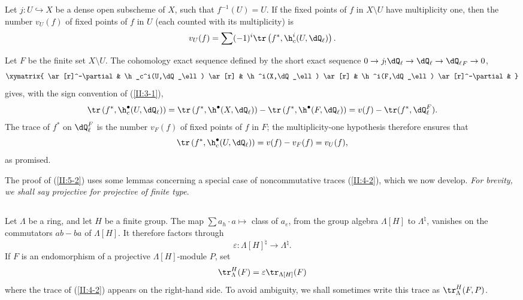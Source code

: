 \documentclass[oneside]{book}
\begin{document}
\begin{corollary_}\label{II:5-4}
Let $j:U\hookrightarrow X$ be a dense open subscheme of $X$, such that
$f^{-1}(U)=U$. If the fixed points of $f$ in $X\setminus U$ have multiplicity
one, then the number $v_U(f)$ of fixed points of $f$ in $U$ (each counted
with its multiplicity) is
\[
  v_U(f) = \sum (-1)^i \tr\left(f^*,\h_c^i(U,\dQ_\ell)\right) \text{.}
\]
\end{corollary_}

Let $F$ be the finite set $X\setminus U$. The cohomology exact sequence
defined by the short exact sequence
$0\to j_! \dQ_\ell\to\dQ_\ell\to{\dQ_\ell}_F\to 0$,
\[\xymatrix{
  \ar[r]^-\partial
    & \h_c^i(U,\dQ_\ell) \ar[r]
    & \h^i(X,\dQ_\ell) \ar[r]
    & \h^i(F,\dQ_\ell) \ar[r]^-\partial
    &
}\]
gives, with the sign convention of (\ref{II:3-1}),
\[
  \tr\left(f^*,\h_c^\bullet(U,\dQ_\ell)\right)
    = \tr\left(f^*,\h^\bullet(X,\dQ_\ell)\right) - \tr\left(f^*,\h^\bullet(F,\dQ_\ell)\right)
    = v(f) - \tr(f^*,\dQ_\ell^F) \text{.}
\]
The trace of $f^*$ on $\dQ_\ell^F$ is the number $v_F(f)$ of fixed points of
$f$ in $F$; the multiplicity-one hypothesis therefore ensures that
\[
  \tr\left(f^*,\h_c^\bullet(U,\dQ_\ell)\right)
    = v(f) - v_F(f) = v_U(f) \text{,}
\]
as promised.

The proof of (\ref{II:5-2}) uses some lemmas concerning a special case of
noncommutative traces (\ref{II:4-2}), which we now develop. \emph{For
brevity, we shall say projective for projective of finite type}.






\subsection{}\label{II:5-5}

Let $\Lambda$ be a ring, and let $H$ be a finite group. The map
$\sum a_h \cdot a\mapsto $ class of $a_e$, from the group algebra
$\Lambda[H]$ to $\Lambda^\natural$, vanishes on the commutators $ab-ba$ of
$\Lambda[H]$. It therefore factors through
\[
  \varepsilon : \Lambda[H]^\natural \to \Lambda^\natural \text{.}
\]
If $F$ is an endomorphism of a projective $\Lambda[H]$-module $P$, set
\[
  \tr_\Lambda^H(F) = \varepsilon \tr_{\Lambda[H]} (F)
\]
where the trace of (\ref{II:4-2}) appears on the right-hand side. To avoid
ambiguity, we shall sometimes write this trace as $\tr_\Lambda^H(F,P)$.
\end{document}
